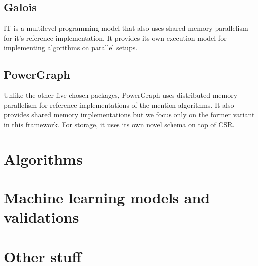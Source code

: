 \subsection{Galois}
IT is a multilevel programming model that also uses shared memory parallelism for it's reference implementation. It provides its own execution model for implementing algorithms on parallel setups.

\subsection{PowerGraph}
Unlike the other five chosen packages, PowerGraph uses distributed memory parallelism for reference implementations of  the mention algorithms. It also provides shared memory implementations but we focus only on the former variant in this framework. For storage, it uses its own novel schema on top of CSR.

 
\section{Algorithms}
\section{Machine learning models and validations}
\section{Other stuff}